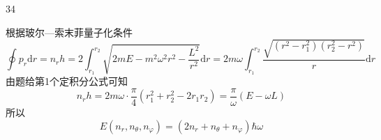 \begin{solution}{34}
\begin{subsolution}
\begin{subsubsolution}
            根据玻尔—索末菲量子化条件
            \begin{equation}
                \oint p _ {r} \mathrm{d} r = n _ {r} h = 2 \int_ {r _ {1}} ^ {r _ {2}} \sqrt {2 m E - m ^ {2} \omega^ {2} r ^ {2} - \frac {L ^ {2}}{r ^ {2}}} \mathrm{d} r = 2 m \omega \int_ {r _ {1}} ^ {r _ {2}} \frac {\sqrt {(r ^ {2} - r _ {1} ^ {2}) (r _ {2} ^ {2} - r ^ {2})}}{r} \mathrm{d} r
                \label{eq:21.s34}
            \end{equation}
            由题给第1个定积分公式可知
            \begin{equation}
                n _ {r} h = 2 m \omega \cdot \frac {\pi}{4} (r _ {1} ^ {2} + r _ {2} ^ {2} - 2 r _ {1} r _ {2}) = \frac {\pi}{\omega} (E - \omega L)
                \label{eq:22.s34}
            \end{equation}
            所以
            \begin{equation}
                E (n _ {r}, n _ {\theta}, n _ {\varphi}) = (2 n _ {r} + n _ {\theta} + n _ {\varphi}) \hbar \omega
                \label{eq:23.s34}
            \end{equation}
        \end{subsubsolution}
    \end{subsolution}
\end{solution}